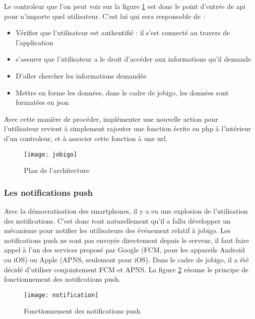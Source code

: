 \documentclass[../rapport.tex]{subfiles}
\begin{document}
        Le controleur que l'on peut voir sur la figure \ref{fig:jobigo} est donc le point d'entrée de \gls{api} pour n'importe quel utilisateur. C'est lui qui sera responsable de~: 
        \begin{itemize}
            \item Vérifier que l'utilisateur est authentifié : il s'est connecté au travers de l'application
            \item s'assurer que l'utilisateur a le droit d'accéder aux informations qu'il demande
            \item D'aller chercher les informations demandée
            \item Mettre en forme les données, dans le cadre de jobigo, les données sont formatées en \gls{json}
        \end{itemize}

        Avec cette manière de procéder, implémenter une nouvelle action pour l'utilisateur revient à simplement rajouter une fonction écrite en php 
        à l'intérieur d'un controleur, et à associer cette fonction à une url.

        \begin{figure}
            \centering
            \texttt{[image: jobigo]}
            \caption{Plan de l'architecture}
            \label{fig:jobigo}
        \end{figure}

        \subsubsection{Les notifications push}
        Avec la démocratisation des smartphones, il y a eu une explosion de l'utilisation des notifications. C'est donc tout naturellement
        qu'il a fallu développer un mécanisme pour notifier les utilisateurs des événement relatif à jobigo.
        Les notifications push ne sont pas envoyée directement depuis le serveur, il faut faire appel à l'un des services proposé par Google (FCM, pour les appareils Android ou iOS) ou Apple (APNS, seulement pour iOS). Dans le cadre de jobigo, il a été décidé d'utiliser conjointement FCM et APNS.
        La figure \ref{fig:notification} résume le principe de fonctionnement des notifications push.

        \begin{figure}
            \centering
            \texttt{[image: notification]}
            \caption{Fonctionnement des notifications push}
            \label{fig:notification}
        \end{figure}
\end{document}
